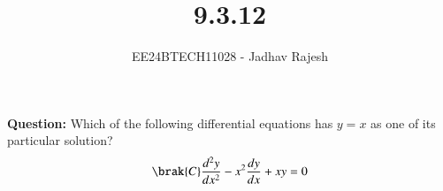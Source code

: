\documentclass[journal]{IEEEtran}
\begin{document}

\vspace{3cm}
\title{9.3.12}
\author{EE24BTECH11028 - Jadhav Rajesh}
{\let\newpage\relax\maketitle}

\renewcommand{\thefigure}{\theenumi}
\renewcommand{\thetable}{\theenumi}
\setlength{\intextsep}{10pt} %


\renewcommand{\thetable}{\theenumi}
 \textbf{Question:} Which of the following differential equations has $y = x$ as one of its particular solution?\\
 \begin{align}
 \brak{C}  \frac{d^{2}y}{dx^{2}}-x^{2}\frac{dy}{dx}+xy=0
 \end{align}
                         
\end{document}
